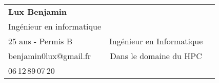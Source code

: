\documentclass[letterpaper,11pt]{article} %
\begin{document}


\begin{tabular*}{7in}{l c r}%
  \textbf{\Large Lux Benjamin}  \\ %
  Ingénieur en informatique  \\
  25 ans - Permis B          & \LARGE{Ingénieur en Informatique}\\ %
  benjamin0lux@gmail.fr      & Dans le domaine du HPC\\ 
  06\,12\,89\,07\,20           %


\end{tabular*}





\end{document}
